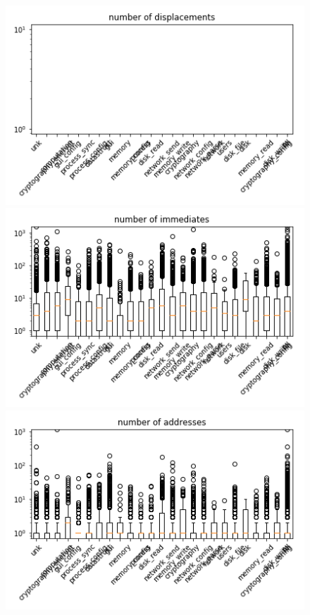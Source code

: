 \begin{appendices}
\begin{figure}[H]
%
\centering
\includegraphics[width=0.9\linewidth]{img/boxplots/v3_unbalanced_number_of_displacements.png}
\endminipage
{}%
\centering
\includegraphics[width=0.9\linewidth]{img/boxplots/v3_unbalanced_number_of_immediates.png}
\endminipage
{}%
\centering
\includegraphics[width=0.9\linewidth]{img/boxplots/v3_unbalanced_number_of_addresses.png}
\endminipage


\end{figure}
\end{appendices}
